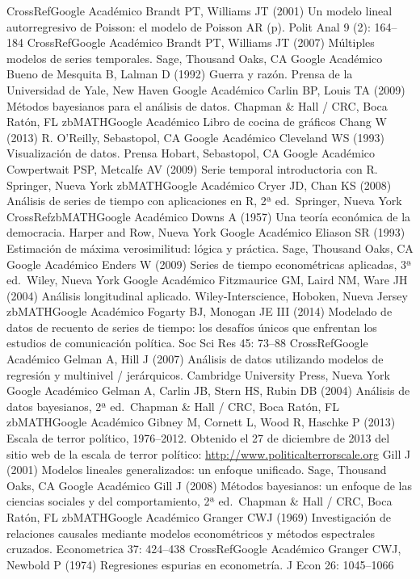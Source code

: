 \documentclass[
]{book}
\begin{document}
CrossRefGoogle Académico
Brandt PT, Williams JT (2001) Un modelo lineal autorregresivo de Poisson: el modelo de Poisson AR (p). Polit Anal 9 (2): 164--184
CrossRefGoogle Académico
Brandt PT, Williams JT (2007) Múltiples modelos de series temporales. Sage, Thousand Oaks, CA
Google Académico
Bueno de Mesquita B, Lalman D (1992) Guerra y razón. Prensa de la Universidad de Yale, New Haven
Google Académico
Carlin BP, Louis TA (2009) Métodos bayesianos para el análisis de datos. Chapman \& Hall / CRC, Boca Ratón, FL
zbMATHGoogle Académico
Libro de cocina de gráficos Chang W (2013) R. O'Reilly, Sebastopol, CA
Google Académico
Cleveland WS (1993) Visualización de datos. Prensa Hobart, Sebastopol, CA
Google Académico
Cowpertwait PSP, Metcalfe AV (2009) Serie temporal introductoria con R. Springer, Nueva York
zbMATHGoogle Académico
Cryer JD, Chan KS (2008) Análisis de series de tiempo con aplicaciones en R, 2ª ed.~Springer, Nueva York
CrossRefzbMATHGoogle Académico
Downs A (1957) Una teoría económica de la democracia. Harper and Row, Nueva York
Google Académico
Eliason SR (1993) Estimación de máxima verosimilitud: lógica y práctica. Sage, Thousand Oaks, CA
Google Académico
Enders W (2009) Series de tiempo econométricas aplicadas, 3ª ed.~Wiley, Nueva York
Google Académico
Fitzmaurice GM, Laird NM, Ware JH (2004) Análisis longitudinal aplicado. Wiley-Interscience, Hoboken, Nueva Jersey
zbMATHGoogle Académico
Fogarty BJ, Monogan JE III (2014) Modelado de datos de recuento de series de tiempo: los desafíos únicos que enfrentan los estudios de comunicación política. Soc Sci Res 45: 73--88
CrossRefGoogle Académico
Gelman A, Hill J (2007) Análisis de datos utilizando modelos de regresión y multinivel / jerárquicos. Cambridge University Press, Nueva York
Google Académico
Gelman A, Carlin JB, Stern HS, Rubin DB (2004) Análisis de datos bayesianos, 2ª ed.~Chapman \& Hall / CRC, Boca Ratón, FL
zbMATHGoogle Académico
Gibney M, Cornett L, Wood R, Haschke P (2013) Escala de terror político, 1976--2012. Obtenido el 27 de diciembre de 2013 del sitio web de la escala de terror político: \url{http://www.politicalterrorscale.org}
Gill J (2001) Modelos lineales generalizados: un enfoque unificado. Sage, Thousand Oaks, CA
Google Académico
Gill J (2008) Métodos bayesianos: un enfoque de las ciencias sociales y del comportamiento, 2ª ed.~Chapman \& Hall / CRC, Boca Ratón, FL
zbMATHGoogle Académico
Granger CWJ (1969) Investigación de relaciones causales mediante modelos econométricos y métodos espectrales cruzados. Econometrica 37: 424--438
CrossRefGoogle Académico
Granger CWJ, Newbold P (1974) Regresiones espurias en econometría. J Econ 26: 1045--1066
\end{document}
